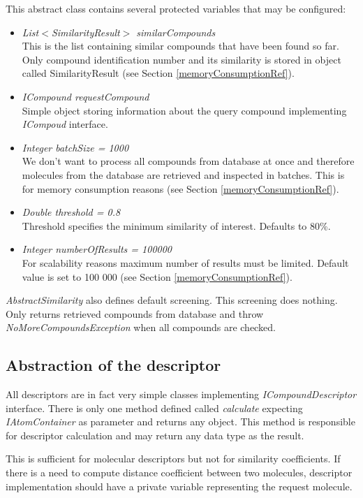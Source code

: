 \documentclass[thesis=M,english]{FITthesis}[2012/10/20]
\begin{document}
This abstract class contains several protected variables that may be configured:
\begin{itemize}
\item \textit{List$<$SimilarityResult$>$ similarCompounds} \\ This is the list containing similar compounds that have been found so far. Only compound identification number and its similarity is stored in object called SimilarityResult (see Section \ref{memoryConsumptionRef}).
\item \textit{ICompound requestCompound} \\ Simple object storing information about the query compound implementing \textit{ICompoud} interface.
\item \textit{Integer batchSize = 1000} \\ We don’t want to process all compounds from database at once and therefore molecules from the database are retrieved and inspected in batches. This is for memory consumption reasons (see Section \ref{memoryConsumptionRef}).
\item \textit{Double threshold = 0.8} \\ Threshold specifies the minimum similarity of interest. Defaults to 80\%.
\item \textit{Integer numberOfResults = 100000} \\ For scalability reasons maximum number of results must be limited. Default value is set to 100 000 (see Section \ref{memoryConsumptionRef}).
\end{itemize}

\textit{AbstractSimilarity} also defines default screening. This screening does nothing. Only returns retrieved compounds from database and throw \textit{NoMoreCompoundsException} when all compounds are checked.




\subsection{Abstraction of the descriptor}
All descriptors are in fact very simple classes implementing \textit{ICompoundDescriptor} interface. There is only one method defined called \textit{calculate} expecting \textit{IAtomContainer} as parameter and returns any object. This method is responsible for descriptor calculation and may return any data type as the result.

This is sufficient for molecular descriptors but not for similarity coefficients. If there is a need to compute distance coefficient between two molecules, descriptor implementation should have a private variable representing the request molecule.
\end{document}
